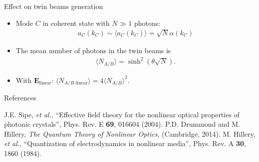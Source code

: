 \documentclass[final]{beamer} %
\begin{document}
\begin{frame}[t]
\begin{columns}[t]
\begin{column}{0.30\paperwidth}
\begin{alertblock}{Effect on twin beams generation}
\begin{itemize}
\item Mode $C$ in coherent state with $ N \gg 1$ photons: 
\begin{align}
a_C(k_C) \sim \langle a_C(k_C) \rangle=\sqrt{N} \alpha(k_C)
\end{align}
\item The mean number of photons in the twin beams is 
\begin{align}
\langle N_{A/B} \rangle=\sinh^2(\theta \sqrt{N}).
\end{align} 
\item With $\mathbf{E}_{\text{linear}}$: $\langle N_{A/B \text{ linear}} \rangle=4\langle N_{A/B} \rangle^2.$
\end{itemize}
\end{alertblock}

\begin{alertblock}{References}
\begin{thebibliography}{99}
 J.E. Sipe, \emph{et al.}, ``Effective field theory for the nonlinear optical properties of photonic crystals'', Phys. Rev. E {\bf 69}, 016604 (2004).
 P.D. Drummond and M. Hillery, \emph{The Quantum Theory of Nonlinear Optics}, (Cambridge, 2014).
 M. Hillery, \emph{et al.}, ``Quantization of electrodynamics in nonlinear media'', Phys. Rev. A {\bf 30}, 1860 (1984).
\end{thebibliography}
\end{alertblock}

  \end{column}
 \end{columns}
\end{frame}
\end{document}
